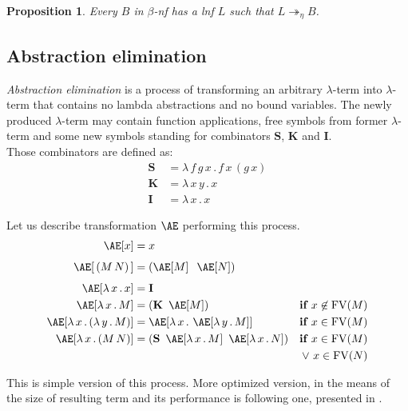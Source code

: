 \documentclass{sig-alternate}
\newtheorem{proposition}{Proposition}
\newcommand{\Lets}{Let us\xspace}
\newcommand{\lterm}{$\lambda$-term\xspace}
\newcommand{\lamb}[2]{( \lambda \, #1 \, . \, #2 )}
\newcommand{\lam}[2]{\lambda \, #1 \, . \, #2}
\newcommand{\FV}{\mathop{\mathrm{FV}}}
\newcommand{\Scomb }{\mathbf{S}}
\newcommand{\Kcomb }{\mathbf{K}}
\newcommand{\Icomb }{\mathbf{I}}
\newcommand{\bnf}{$\beta$-\textit{nf}\xspace}
\newcommand{\lnf}{\textit{lnf}\xspace}
\newcommand{\Ae}{\mathop{\mathrm{\AE}}}
\begin{document}
\begin{proposition}
Every $B$ in \bnf has a \lnf 
$L$ such that $L \twoheadrightarrow_{\eta} B$.
\end{proposition}

\subsection{Abstraction elimination}

\textit{Abstraction elimination} is a process of transforming 
an arbitrary \lterm into \lterm that contains no lambda abstractions
and no bound variables.
The newly produced \lterm may contain function applications, 
free symbols from former \lterm and some new symbols standing for 
combinators $\Scomb$, $\Kcomb$ and $\Icomb$. \\

Those combinators are defined as:
\begin{align*}
\Scomb &= \lam{f\,g\,x}{f\,x\,(g\,x)} \\
\Kcomb &= \lam{x\,y}{x} \\
\Icomb &= \lam{x}{x} 
\end{align*}


\Lets describe transformation $\Ae$ performing this 
process.
\begin{align*}
\Ae[x]           &= x &\\[0.4em]
\Ae[\,(M\,N)\,]  &= (\Ae[M]\;\;\Ae[N]) &\\[0.4em]
\Ae[\lam{x}{x}]  &= \Icomb &\\
\Ae[\lam{x}{M}]  &= (\Kcomb~\Ae[M]) &\textbf{if } x \not\in \FV(M)\\
\Ae[\lam{x}{\lamb{y}{M}}] &= \Ae[\lam{x}{\Ae[\lam{y}{M}]}]  
&\textbf{if } x \in \FV(M)\\
\Ae[\lam{x}{(M\,N)}] &= (\Scomb~\Ae[\lam{x}{M}]~\Ae[\lam{x}{N}])  
&\textbf{if } x \in \FV(M)\\
&&\vee~ x \in \FV(N)\\
\end{align*}


This is simple version of this process. More optimized version,
in the means of the size of resulting term and its performance
is following one, presented in \cite{jones87}.\\
\end{document}
